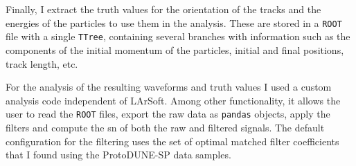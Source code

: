 Finally, I extract the truth values for the orientation of the tracks and the energies of the particles to use them in the analysis. These are stored in a \texttt{ROOT} file with a single \texttt{TTree}, containing several branches with information such as the components of the initial momentum of the particles, initial and final positions, track length, etc.

For the analysis of the resulting waveforms and truth values I used a custom analysis code independent of LArSoft. Among other functionality, it allows the user to read the \texttt{ROOT} files, export the raw data as \texttt{pandas} objects, apply the filters and compute the \gls{sn} of both the raw and filtered signals. The default configuration for the filtering uses the set of optimal matched filter coefficients that I found using the ProtoDUNE-SP data samples.

